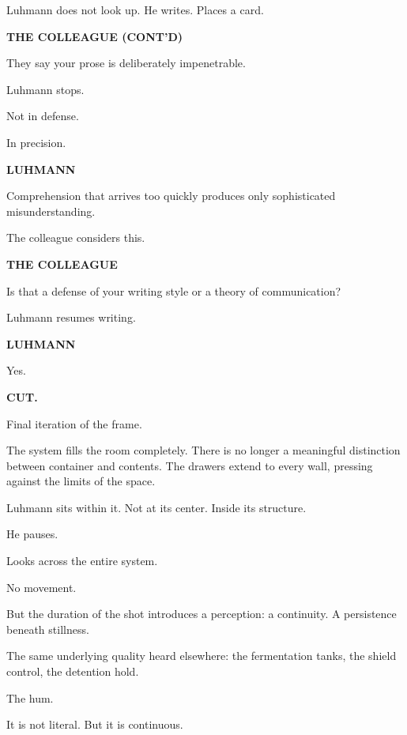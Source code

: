 \documentclass[12pt]{article}
\newcommand{\character}[1]{%
  \vspace{8pt}%
  \begin{center}\textbf{#1}\end{center}%
  \vspace{-4pt}%
}
\newenvironment{dialogue}{%
  \begin{center}%
  \begin{minipage}{0.62\textwidth}%
}{%
  \end{minipage}%
  \end{center}%
  \vspace{4pt}%
}
\newenvironment{action}{%
  \vspace{4pt}%
  \noindent\ignorespaces%
}{%
  \vspace{6pt}%
}
\begin{document}
\begin{action}
Luhmann does not look up. He writes. Places a card.
\end{action}

\character{THE COLLEAGUE (CONT'D)}
\begin{dialogue}
They say your prose is deliberately impenetrable.
\end{dialogue}

\begin{action}
Luhmann stops.

Not in defense.

In precision.
\end{action}

\character{LUHMANN}
\begin{dialogue}
Comprehension that arrives too quickly produces only sophisticated misunderstanding.
\end{dialogue}

\begin{action}
The colleague considers this.
\end{action}

\character{THE COLLEAGUE}
\begin{dialogue}
Is that a defense of your writing style or a theory of communication?
\end{dialogue}

\begin{action}
Luhmann resumes writing.
\end{action}

\character{LUHMANN}
\begin{dialogue}
Yes.
\end{dialogue}

\textbf{CUT.}

\begin{action}
Final iteration of the frame.

The system fills the room completely. There is no longer a meaningful distinction between container and contents. The drawers extend to every wall, pressing against the limits of the space.

\medskip

Luhmann sits within it. Not at its center. Inside its structure.

\medskip

He pauses.

Looks across the entire system.

\medskip

No movement.

\medskip

But the duration of the shot introduces a perception: a continuity. A persistence beneath stillness.

\medskip

The same underlying quality heard elsewhere: the fermentation tanks, the shield control, the detention hold.

\medskip

The hum.

\medskip

It is not literal. But it is continuous.
\end{action}
\end{document}
